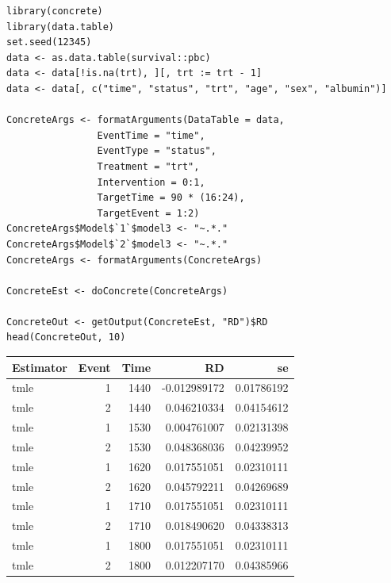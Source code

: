 \documentclass{report}
\newcommand{\1}{\ensuremath{\mathbf{1}}}
\begin{document}
\begin{lstlisting}
library(concrete)
library(data.table)
set.seed(12345)
data <- as.data.table(survival::pbc)
data <- data[!is.na(trt), ][, trt := trt - 1]
data <- data[, c("time", "status", "trt", "age", "sex", "albumin")]

ConcreteArgs <- formatArguments(DataTable = data,
				EventTime = "time",
				EventType = "status",
				Treatment = "trt",
				Intervention = 0:1,
				TargetTime = 90 * (16:24),
				TargetEvent = 1:2)
ConcreteArgs$Model$`1`$model3 <- "~.*."
ConcreteArgs$Model$`2`$model3 <- "~.*."
ConcreteArgs <- formatArguments(ConcreteArgs)

ConcreteEst <- doConcrete(ConcreteArgs)

ConcreteOut <- getOutput(ConcreteEst, "RD")$RD
head(ConcreteOut, 10)
\end{lstlisting}

\begin{center}
\begin{tabular}{lrrrr}
Estimator & Event & Time & RD & se\\
\hline
tmle & 1 & 1440 & -0.012989172 & 0.01786192\\
tmle & 2 & 1440 & 0.046210334 & 0.04154612\\
tmle & 1 & 1530 & 0.004761007 & 0.02131398\\
tmle & 2 & 1530 & 0.048368036 & 0.04239952\\
tmle & 1 & 1620 & 0.017551051 & 0.02310111\\
tmle & 2 & 1620 & 0.045792211 & 0.04269689\\
tmle & 1 & 1710 & 0.017551051 & 0.02310111\\
tmle & 2 & 1710 & 0.018490620 & 0.04338313\\
tmle & 1 & 1800 & 0.017551051 & 0.02310111\\
tmle & 2 & 1800 & 0.012207170 & 0.04385966\\
\end{tabular}
\end{center}
\end{document}
